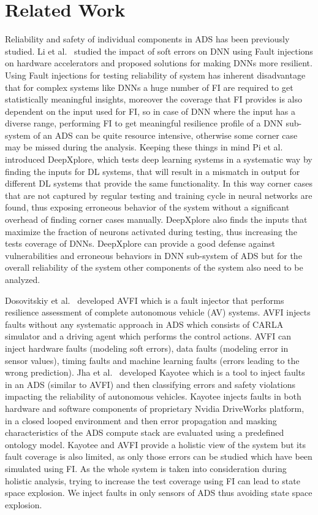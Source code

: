 \section{Related Work}
Reliability and safety of individual components in ADS has been previously studied. Li et al.~\cite{guanpeng17sc} studied the impact of soft errors on DNN using Fault injections on hardware accelerators and proposed solutions for making DNNs more resilient. Using Fault injections for testing reliability of system has inherent disadvantage that for complex systems like DNNs a huge number of FI are required to get statistically meaningful insights, moreover the coverage that FI provides is also dependent on the input used for FI, so in case of DNN where the input has a diverse range, performing FI to get meaningful resilience profile of a DNN sub-system of an ADS can be quite resource intensive, otherwise some corner case may be missed during the analysis. Keeping these things in mind Pi et al.~\cite{kexin17sosp} introduced DeepXplore, which tests deep learning systems in a systematic way by finding the inputs for DL systems, that will result in a mismatch in output for different DL systems that provide the same functionality. In this way corner cases that are not captured by regular testing and training cycle in neural networks are found, thus exposing erroneous behavior of the system without a significant overhead of finding corner cases manually. DeepXplore also finds the inputs that maximize the fraction of neurons activated during testing, thus increasing the tests coverage of DNNs. DeepXplore can provide a good defense against vulnerabilities and erroneous behaviors in DNN sub-system of ADS but for the overall reliability of the system other components of the system also need to be analyzed.

Dosovitskiy et al.~\cite{avfi} developed AVFI which is a fault injector that performs resilience assessment of complete autonomous vehicle (AV) systems. AVFI injects faults without any systematic approach in ADS which consists of CARLA simulator and a driving agent which performs the control actions. AVFI can inject hardware faults (modeling soft errors), data faults (modeling error in sensor values), timing faults and machine learning faults (errors leading to the wrong prediction).
Jha et al.~\cite{jha18art} developed Kayotee which is a tool to inject faults in an ADS (similar to AVFI) and then classifying errors and safety violations impacting the reliability of autonomous vehicles. Kayotee injects faults in both hardware and software components of proprietary Nvidia DriveWorks platform, in a closed looped environment and then error propagation and masking characteristics of the ADS compute stack are evaluated using a predefined ontology model.
Kayotee and AVFI provide a holistic view of the system but its fault coverage is also limited, as only those errors can be studied which have been simulated using FI. As the whole system is taken into consideration during holistic analysis, trying to increase the test coverage using FI 
can lead to state space explosion. We inject faults in only sensors of ADS thus avoiding state space explosion.

